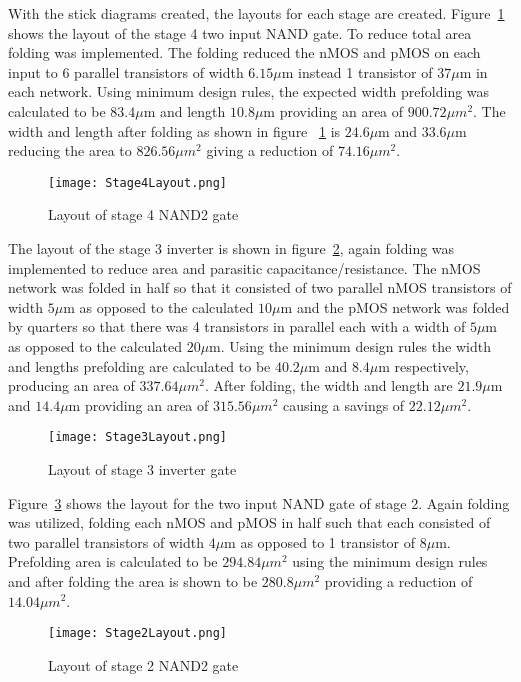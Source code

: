 \documentclass[conference]{IEEEtran}
\begin{document}
With the stick diagrams created, the layouts for each stage are created. Figure~\ref{fig:Stage4Layout} shows the layout of the stage 4 two input NAND gate. To reduce total area folding was implemented. The folding reduced the nMOS and pMOS on each input to 6 parallel transistors of width $6.15\mu$m instead 1 transistor of $37\mu$m in each network. Using minimum design rules, the expected width prefolding was calculated to be $83.4\mu$m and length $10.8\mu$m providing an area of $900.72\mu m^2$. The width and length after folding as shown in figure ~\ref{fig:Stage4Layout} is $24.6\mu$m and $33.6\mu$m reducing the area to $826.56\mu m^2$ giving a reduction of $74.16\mu m^2$. 


\begin{figure}[H]
  \center
    \texttt{[image: Stage4Layout.png]}
    \caption{Layout of stage 4 NAND2 gate}
    \label{fig:Stage4Layout}
  \end{figure} 

The layout of the stage 3 inverter is shown in figure~\ref{fig:Stage3Layout}, again folding was implemented to reduce area and parasitic capacitance/resistance. The nMOS network was folded in half so that it consisted of two parallel nMOS transistors of width $5\mu$m as opposed to the calculated $10\mu$m and the pMOS network was folded by quarters so that there was 4 transistors in parallel each with a width of $5\mu$m as opposed to the calculated $20\mu$m. Using the minimum design rules the width and lengths prefolding are calculated to be $40.2\mu$m and $8.4\mu$m respectively, producing an area of $337.64\mu m^2$. After folding, the width and length are $21.9\mu$m and $14.4\mu$m providing an area of $315.56\mu m^2$ causing a savings of $22.12\mu m^2$. 


\begin{figure}[H]
  \center
    \texttt{[image: Stage3Layout.png]}
    \caption{Layout of stage 3 inverter gate}
    \label{fig:Stage3Layout}
  \end{figure} 

Figure~\ref{fig:Stage2Layout} shows the layout for the two input NAND gate of stage 2. Again folding was utilized, folding each nMOS and pMOS in half such that each consisted of two parallel transistors of width $4\mu$m as opposed to 1 transistor of $8\mu$m. Prefolding area is calculated to be $294.84\mu m^2$ using the minimum design rules and after folding the area is shown to be $280.8\mu m^2$ providing a reduction of $14.04\mu m^2$.

\begin{figure}[H]
  \center
    \texttt{[image: Stage2Layout.png]}
    \caption{Layout of stage 2 NAND2 gate}
    \label{fig:Stage2Layout}
  \end{figure}
\end{document}
